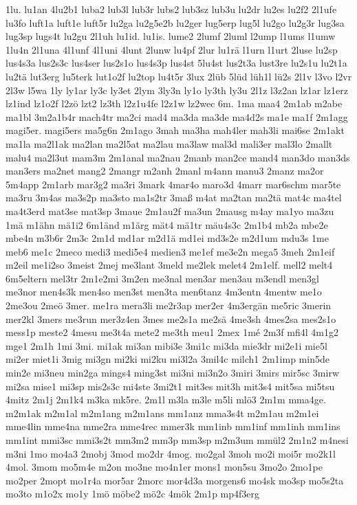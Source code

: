 {1lu.
lu1an
4lu2b1
luba2
lub3l
lub3r
lubs2
lub3sz
lub3u
lu2dr
lu2es
lu2f2
2l1ufe
lu3fo
luft1a
luft1e
luft5r
lu2ga
lu2g5e2b
lu2ger
lug5erp
lug5l
lu2go
lu2g3r
lug3sa
lug3sp
lugs4t
lu2gu
2l1uh
lu1id.
lu1is.
lume2
2lumf
2luml
l2ump
l1ums
l1umw
1lu4n
2l1una
4l1unf
4l1uni
4lunt
2lunw
lu4pf
2lur
lu1rä
l1urn
l1urt
2luse
lu2sp
lus4s3a
lus2s3c
lus4ser
lus2s1o
lus4s3p
lus4st
5lu4st
lus2t3a
lust3re
lu2s1u
lu2t1a
lu2tä
lut3erg
lu5terk
lut1o2f
lu2top
lu4t5r
3lux
2lüb
5lüd
lüh1l
lü2s
2l1v
l3vo
l2vr
2l3w
l5wa
1ly
ly1ar
ly3c
ly3et
2lym
3ly3n
ly1o
ly3th
ly3u
2l1z
l3z2an
lz1ar
lz1erz
lz1ind
lz1o2f
l2zö
lzt2
lz3th
l2z1u4fe
l2z1w
lz2wec
6m.
1ma
maa4
2m1ab
m2abe
ma1bl
3m2a1b4r
mach4tr
ma2ci
mad4
ma3da
ma3de
ma4d2s
ma1e
ma1f
2m1agg
magi5er.
magi5ers
ma5g6n
2m1ago
3mah
ma3ha
mah4ler
mah3li
mai6se
2m1akt
ma1la
ma2l1ak
ma2lan
ma2l5at
ma2lau
ma3law
mal3d
mali3er
mal3lo
2mallt
malu4
ma2l3ut
mam3m
2m1anal
ma2nau
2manb
man2ce
mand4
man3do
man3ds
man3ers
ma2net
mang2
2mangr
m2anh
2manl
m4ann
manu3
2manz
ma2or
5m4app
2m1arb
mar3g2
ma3ri
3mark
4mar4o
maro3d
4marr
mar6schm
mar5te
ma3ru
3m4as
ma3s2p
ma3sto
ma1s2tr
3maß
m4at
ma2tan
ma2tä
mat4c
ma4tel
ma4t3erd
mat3se
mat3sp
3maue
2m1au2f
ma3un
2mausg
m4ay
ma1yo
ma3zu
1mä
m1ähn
mä1i2
6m1änd
m1ärg
mät4
mä1tr
mäu4s3c
2m1b4
mb2a
mbe2e
mbe4n
m3b6r
2m3c
2m1d
md1ar
m2d1ä
md1ei
md3s2e
m2d1um
mdu3s
1me
meb6
me1c
2meco
medi3
medi5e4
medien3
me1ef
me3e2n
mega5
3meh
2m1eif
m2eil
me1i2so
3meist
2mej
me3lant
3meld
me2lek
melet4
2m1elf.
mell2
melt4
6m5eltern
mel3tr
2m1e2mi
3m2en
me3nal
men3ar
men3au
m3endl
men3gl
me3nor
men4s3k
men4so
men3st
men3ta
men6tanz
4m3entn
4mentw
me1o
2me3ou
2meö
3mer.
me1ra
mera3li
me2r3ap
mer2er
4m3ergän
me5ric
3merin
mer2kl
3mers
me3run
mer3z4en
3mes
me2s1a
me2sä
4me3sh
4mes2sa
mes2s1o
mess1p
meste2
4mesu
me3t4a
mete2
me3th
meu1
2mex
1mé
2m3f
mfi4l
4m1g2
mge1
2m1h
1mi
3mi.
mi1ak
mi3an
mibi3e
3mi1c
mi3da
mie3dr
mi2e1i
mie5l
mi2er
miet1i
3mig
mi3gn
mi2ki
mi2ku
mi3l2a
3mil4c
milch1
2m1imp
min5de
min2e
mi3neu
min2ga
mings4
ming3st
mi3ni
mi3n2o
3miri
3mirs
mir5sc
3mirw
mi2sa
mise1
mi3sp
mis2s3c
mi4ste
3mi2t1
mit3es
mit3h
mit3s4
mit5sa
mi5tsu
4mitz
2m1j
2m1k4
m3ka
mk5re.
2m1l
m3la
m3le
m5li
mlö3
2m1m
mma4ge.
m2m1ak
m2m1al
m2m1ang
m2m1ans
mm1anz
mma3s4t
m2m1au
m2m1ei
mme4lin
mme4na
mme2ra
mme4rec
mmer3k
mm1inb
mm1inf
mm1inh
mm1ins
mm1int
mmi3sc
mmi3s2t
mm3m2
mm3p
mm3sp
m2m3um
mmül2
2m1n2
m4nesi
m3ni
1mo
mo4a3
2mobj
3mod
mo2dr
4mog.
mo2gal
3moh
mo2i
moi5r
mo2k1l
4mol.
3mom
mo5m4e
m2on
mo3ne
mo4n1er
mons1
mon5su
3mo2o
2mo1pe
mo2per
2mopt
mo1r4a
mor5ar
2morc
mor4d3a
morgens6
mo4sk
mo3sp
mo5s2ta
mo3to
m1o2x
mo1y
1mö
möbe2
mö2c
4mök
2m1p
mp4f3erg
}
